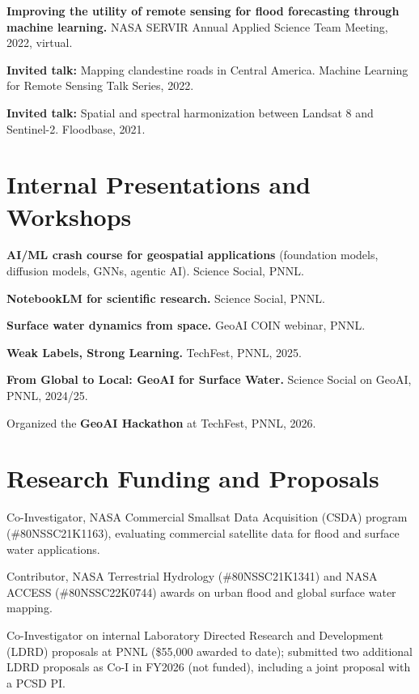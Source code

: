 \documentclass[10pt,letterpaper]{article}
\begin{document}
\begin{entrylist}
  \item \textbf{Improving the utility of remote sensing for flood forecasting through machine learning.}
  NASA SERVIR Annual Applied Science Team Meeting, 2022, virtual.

  \item \textbf{Invited talk:} Mapping clandestine roads in Central America. Machine Learning for Remote Sensing Talk Series, 2022.

  \item \textbf{Invited talk:} Spatial and spectral harmonization between Landsat 8 and Sentinel-2. Floodbase, 2021.
\end{entrylist}

\section*{Internal Presentations and Workshops}

\begin{entrylist}
  \item \textbf{AI/ML crash course for geospatial applications} (foundation models, diffusion models, GNNs, agentic AI). Science Social, PNNL.
  \item \textbf{NotebookLM for scientific research.} Science Social, PNNL.
  \item \textbf{Surface water dynamics from space.} GeoAI COIN webinar, PNNL.
  \item \textbf{Weak Labels, Strong Learning.} TechFest, PNNL, 2025.
  \item \textbf{From Global to Local: GeoAI for Surface Water.} Science Social on GeoAI, PNNL, 2024/25.
  \item Organized the \textbf{GeoAI Hackathon} at TechFest, PNNL, 2026.
\end{entrylist}

\section*{Research Funding and Proposals}

\begin{entrylist}
  \item Co-Investigator, NASA Commercial Smallsat Data Acquisition (CSDA) program (\#80NSSC21K1163), evaluating commercial satellite data for flood and surface water applications.

  \item Contributor, NASA Terrestrial Hydrology (\#80NSSC21K1341) and NASA ACCESS\allowbreak{} (\#80NSSC22K0744) awards on urban flood and global surface water mapping.

  \item Co-Investigator on internal Laboratory Directed Research and Development (LDRD) proposals at PNNL (\$55,000 awarded to date); submitted two additional LDRD proposals as Co-I in FY2026 (not funded), including a joint proposal with a PCSD PI.
\end{entrylist}
\end{document}
